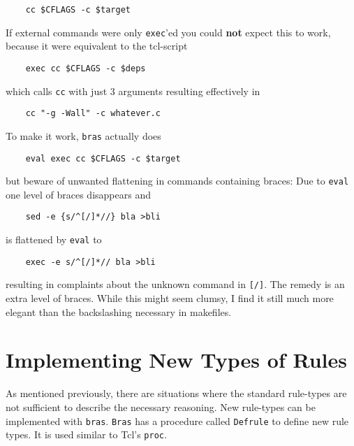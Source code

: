\documentclass[12pt]{article}
\newcommand{\bras}{\texttt{bras}}
\newcommand{\Bras}{\texttt{Bras}}
\begin{document}
\begin{verbatim}
    cc $CFLAGS -c $target
\end{verbatim}

If external commands were only \texttt{exec}'ed you could \textbf{not}
expect this to work, because it were equivalent to the tcl-script

\begin{verbatim}
    exec cc $CFLAGS -c $deps
\end{verbatim}

which calls \texttt{cc} with just 3 arguments resulting effectively in

\begin{verbatim}
    cc "-g -Wall" -c whatever.c
\end{verbatim}

To make it work, \bras{} actually does

\begin{verbatim}
    eval exec cc $CFLAGS -c $target
\end{verbatim}

but beware of unwanted flattening in commands containing braces: Due
to \texttt{eval} one level of braces
disappears and

\begin{verbatim}
    sed -e {s/^[/]*//} bla >bli
\end{verbatim}

is flattened by \texttt{eval} to

\begin{verbatim}
    exec -e s/^[/]*// bla >bli
\end{verbatim}

resulting in complaints about the unknown command in
\texttt{[/]}. The remedy is an extra level of braces. While this might
seem clumsy, I find it still much more elegant than the backslashing
necessary in makefiles.


\section{Implementing New Types of Rules}
\label{secNewRules}
As mentioned previously, there are situations where the standard
rule-types are not sufficient to describe the necessary reasoning.
New rule-types can be implemented
with \bras{}. \Bras{} has a procedure called \texttt{Defrule} to
define new rule types. It is used similar to Tcl's \texttt{proc}.
\end{document}
